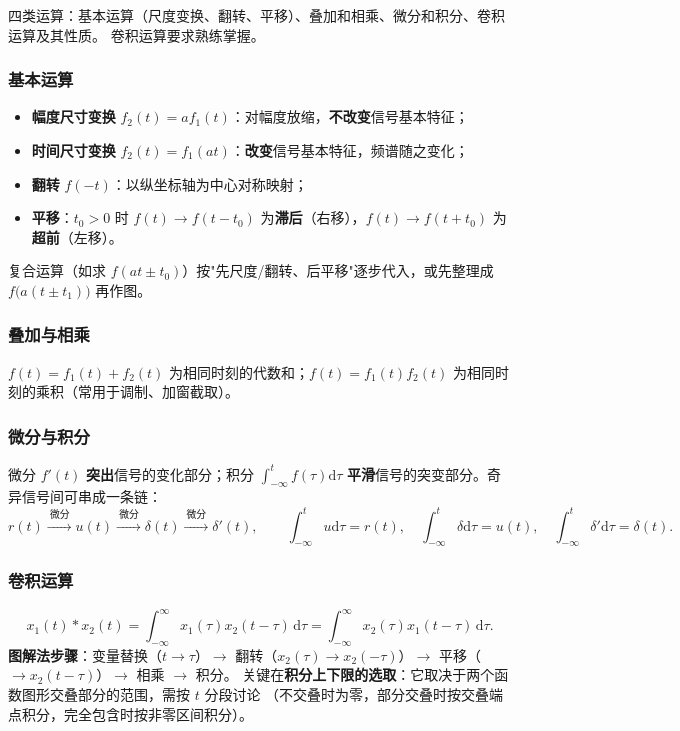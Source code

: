 四类运算：基本运算（尺度变换、翻转、平移）、叠加和相乘、微分和积分、卷积运算及其性质。
卷积运算要求熟练掌握。

\subsubsection{基本运算}

\begin{itemize}
\item \textbf{幅度尺寸变换} $f_2(t)=af_1(t)$：对幅度放缩，\textbf{不改变}信号基本特征；
\item \textbf{时间尺寸变换} $f_2(t)=f_1(at)$：\textbf{改变}信号基本特征，频谱随之变化；
\item \textbf{翻转} $f(-t)$：以纵坐标轴为中心对称映射；
\item \textbf{平移}：$t_0>0$ 时 $f(t)\to f(t-t_0)$ 为\textbf{滞后}（右移），$f(t)\to f(t+t_0)$ 为\textbf{超前}（左移）。
\end{itemize}
复合运算（如求 $f(at\pm t_0)$）按"先尺度/翻转、后平移"逐步代入，或先整理成 $f\big(a(t\pm t_1)\big)$ 再作图。

\subsubsection{叠加与相乘}

$f(t)=f_1(t)+f_2(t)$ 为相同时刻的代数和；$f(t)=f_1(t)f_2(t)$ 为相同时刻的乘积（常用于调制、加窗截取）。

\subsubsection{微分与积分}

微分 $f'(t)$ \textbf{突出}信号的变化部分；积分 $\displaystyle\int_{-\infty}^{t}f(\tau)\mathrm{d}\tau$
\textbf{平滑}信号的突变部分。奇异信号间可串成一条链：
\begin{equation}
r(t)\xrightarrow{\ \text{微分}\ }u(t)\xrightarrow{\ \text{微分}\ }\delta(t)
\xrightarrow{\ \text{微分}\ }\delta'(t),\qquad
\int_{-\infty}^{t}u\mathrm{d}\tau=r(t),\quad
\int_{-\infty}^{t}\delta\mathrm{d}\tau=u(t),\quad
\int_{-\infty}^{t}\delta'\mathrm{d}\tau=\delta(t).
\end{equation}

\subsubsection{卷积运算}

\begin{equation}
x_1(t)*x_2(t)=\int_{-\infty}^{\infty}x_1(\tau)x_2(t-\tau)\,\mathrm{d}\tau
=\int_{-\infty}^{\infty}x_2(\tau)x_1(t-\tau)\,\mathrm{d}\tau .
\end{equation}
\textbf{图解法步骤}：变量替换（$t\to\tau$）$\to$ 翻转（$x_2(\tau)\to x_2(-\tau)$）$\to$
平移（$\to x_2(t-\tau)$）$\to$ 相乘 $\to$ 积分。
关键在\textbf{积分上下限的选取}：它取决于两个函数图形交叠部分的范围，需按 $t$ 分段讨论
（不交叠时为零，部分交叠时按交叠端点积分，完全包含时按非零区间积分）。

